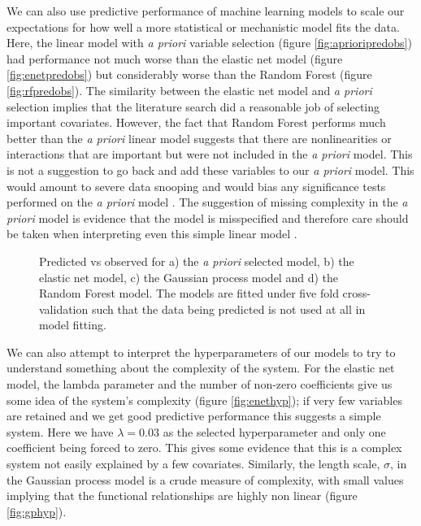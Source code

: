 \documentclass[10pt,]{article}
\begin{document}
We can also use predictive performance of machine learning models to scale our expectations for how well a more statistical or mechanistic model fits the data.
Here, the linear model with \emph{a priori} variable selection (figure \ref{fig:aprioripredobs}) had performance not much worse than the elastic net model (figure \ref{fig:enetpredobs}) but considerably worse than the Random Forest (figure \ref{fig:rfpredobs}).
The similarity between the elastic net model and \emph{a priori} selection implies that the literature search did a reasonable job of selecting important covariates.
However, the fact that Random Forest performs much better than the \emph{a priori} linear model suggests that there are nonlinearities or interactions that are important but were not included in the \emph{a priori} model.
This is not a suggestion to go back and add these variables to our \emph{a priori} model.
This would amount to severe data snooping and would bias any significance tests performed on the \emph{a priori} model \citep{white2000reality}.
The suggestion of missing complexity in the \emph{a priori} model is evidence that the model is misspecified and therefore care should be taken when interpreting even this simple linear model \citep{lyddon2018nonparametric, maldonado1993interpreting}. 



\begin{figure}[t!]
  \centering

  \label{fig:predobs}
  \caption{
    Predicted vs observed for a) the \emph{a priori} selected model, b) the elastic net model, c) the Gaussian process model and d) the Random Forest model.
    The models are fitted under five fold cross-validation such that the data being predicted is not used at all in model fitting.
  }
\end{figure}

We can also attempt to interpret the hyperparameters of our models to try to understand something about the complexity of the system.
For the elastic net model, the lambda parameter and the number of non-zero coefficients give us some idea of the system's complexity (figure \ref{fig:enethyp}); if very few variables are retained and we get good predictive performance this suggests a simple system.
Here we have \(\lambda = 0.03\) as the selected hyperparameter and only one coefficient being forced to zero.
This gives some evidence that this is a complex system not easily explained by a few covariates.
Similarly, the length scale, \(\sigma\), in the Gaussian process model is a crude measure of complexity, with small values implying that the functional relationships are highly non linear (figure \ref{fig:gphyp}).
\end{document}
